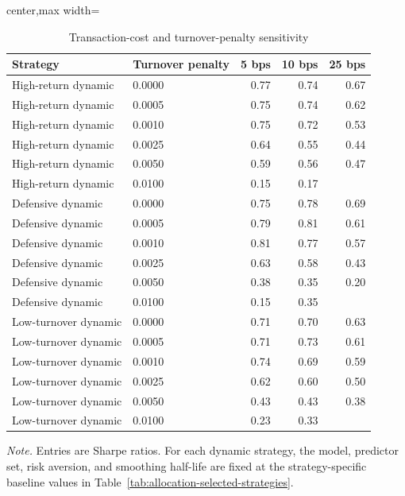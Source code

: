 ﻿\begin{table}[!htbp]
\centering
\caption{Transaction-cost and turnover-penalty sensitivity}
\label{tab:allocation-cost-turnover-sensitivity}
\small
\setlength{\tabcolsep}{6pt}
\renewcommand{\arraystretch}{1.12}
\begin{adjustbox}{center,max width=\linewidth}
\begin{tabular}{llrrr}
\toprule
Strategy & Turnover penalty & 5 bps & 10 bps & 25 bps \\
\midrule
High-return dynamic & 0.0000 & 0.77 & 0.74 & 0.67 \\
High-return dynamic & 0.0005 & 0.75 & 0.74 & 0.62 \\
High-return dynamic & 0.0010 & 0.75 & 0.72 & 0.53 \\
High-return dynamic & 0.0025 & 0.64 & 0.55 & 0.44 \\
High-return dynamic & 0.0050 & 0.59 & 0.56 & 0.47 \\
High-return dynamic & 0.0100 & 0.15 & 0.17 &  \\
Defensive dynamic & 0.0000 & 0.75 & 0.78 & 0.69 \\
Defensive dynamic & 0.0005 & 0.79 & 0.81 & 0.61 \\
Defensive dynamic & 0.0010 & 0.81 & 0.77 & 0.57 \\
Defensive dynamic & 0.0025 & 0.63 & 0.58 & 0.43 \\
Defensive dynamic & 0.0050 & 0.38 & 0.35 & 0.20 \\
Defensive dynamic & 0.0100 & 0.15 & 0.35 &  \\
Low-turnover dynamic & 0.0000 & 0.71 & 0.70 & 0.63 \\
Low-turnover dynamic & 0.0005 & 0.71 & 0.73 & 0.61 \\
Low-turnover dynamic & 0.0010 & 0.74 & 0.69 & 0.59 \\
Low-turnover dynamic & 0.0025 & 0.62 & 0.60 & 0.50 \\
Low-turnover dynamic & 0.0050 & 0.43 & 0.43 & 0.38 \\
Low-turnover dynamic & 0.0100 & 0.23 & 0.33 &  \\
\bottomrule
\end{tabular}
\end{adjustbox}
\vspace{0.55em}
\begin{minipage}{0.94\linewidth}
\footnotesize
\emph{Note.} Entries are Sharpe ratios. For each dynamic strategy, the model, predictor set, risk aversion, and smoothing half-life are fixed at the strategy-specific baseline values in Table~\ref{tab:allocation-selected-strategies}.
\end{minipage}
\end{table}
